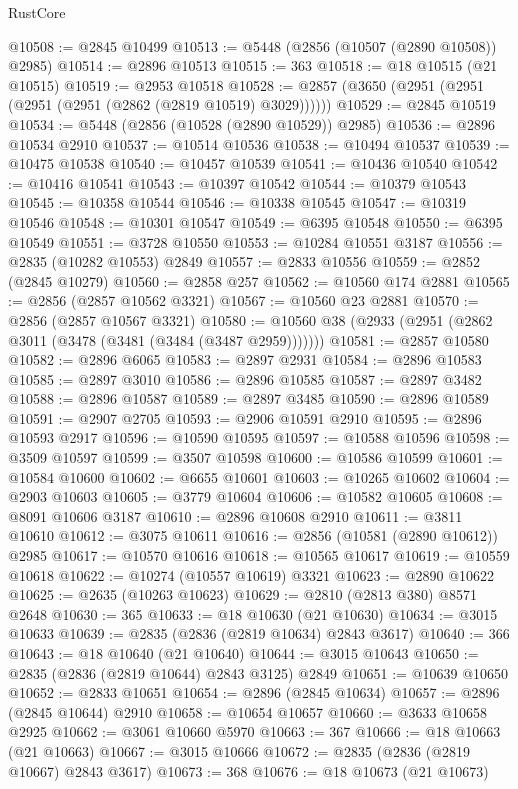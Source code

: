 \begin{lexlean}{RustCore}
\begin{coremodule}
@10508 := @2845 @10499
@10513 := @5448 (@2856 (@10507 (@2890 @10508)) @2985)
@10514 := @2896 @10513
@10515 := 363
@10518 := @18 @10515 (@21 @10515)
@10519 := @2953 @10518
@10528 := @2857 (@3650 (@2951 (@2951 (@2951 (@2951 (@2862 (@2819 @10519) @3029))))))
@10529 := @2845 @10519
@10534 := @5448 (@2856 (@10528 (@2890 @10529)) @2985)
@10536 := @2896 @10534 @2910
@10537 := @10514 @10536
@10538 := @10494 @10537
@10539 := @10475 @10538
@10540 := @10457 @10539
@10541 := @10436 @10540
@10542 := @10416 @10541
@10543 := @10397 @10542
@10544 := @10379 @10543
@10545 := @10358 @10544
@10546 := @10338 @10545
@10547 := @10319 @10546
@10548 := @10301 @10547
@10549 := @6395 @10548
@10550 := @6395 @10549
@10551 := @3728 @10550
@10553 := @10284 @10551 @3187
@10556 := @2835 (@10282 @10553) @2849
@10557 := @2833 @10556
@10559 := @2852 (@2845 @10279)
@10560 := @2858 @257
@10562 := @10560 @174 @2881
@10565 := @2856 (@2857 @10562 @3321)
@10567 := @10560 @23 @2881
@10570 := @2856 (@2857 @10567 @3321)
@10580 := @10560 @38 (@2933 (@2951 (@2862 @3011 (@3478 (@3481 (@3484 (@3487 @2959)))))))
@10581 := @2857 @10580
@10582 := @2896 @6065
@10583 := @2897 @2931
@10584 := @2896 @10583
@10585 := @2897 @3010
@10586 := @2896 @10585
@10587 := @2897 @3482
@10588 := @2896 @10587
@10589 := @2897 @3485
@10590 := @2896 @10589
@10591 := @2907 @2705
@10593 := @2906 @10591 @2910
@10595 := @2896 @10593 @2917
@10596 := @10590 @10595
@10597 := @10588 @10596
@10598 := @3509 @10597
@10599 := @3507 @10598
@10600 := @10586 @10599
@10601 := @10584 @10600
@10602 := @6655 @10601
@10603 := @10265 @10602
@10604 := @2903 @10603
@10605 := @3779 @10604
@10606 := @10582 @10605
@10608 := @8091 @10606 @3187
@10610 := @2896 @10608 @2910
@10611 := @3811 @10610
@10612 := @3075 @10611
@10616 := @2856 (@10581 (@2890 @10612)) @2985
@10617 := @10570 @10616
@10618 := @10565 @10617
@10619 := @10559 @10618
@10622 := @10274 (@10557 @10619) @3321
@10623 := @2890 @10622
@10625 := @2635 (@10263 @10623)
@10629 := @2810 (@2813 @380) @8571 @2648
@10630 := 365
@10633 := @18 @10630 (@21 @10630)
@10634 := @3015 @10633
@10639 := @2835 (@2836 (@2819 @10634) @2843 @3617)
@10640 := 366
@10643 := @18 @10640 (@21 @10640)
@10644 := @3015 @10643
@10650 := @2835 (@2836 (@2819 @10644) @2843 @3125) @2849
@10651 := @10639 @10650
@10652 := @2833 @10651
@10654 := @2896 (@2845 @10634)
@10657 := @2896 (@2845 @10644) @2910
@10658 := @10654 @10657
@10660 := @3633 @10658 @2925
@10662 := @3061 @10660 @5970
@10663 := 367
@10666 := @18 @10663 (@21 @10663)
@10667 := @3015 @10666
@10672 := @2835 (@2836 (@2819 @10667) @2843 @3617)
@10673 := 368
@10676 := @18 @10673 (@21 @10673)

\end{coremodule}
\end{lexlean}

